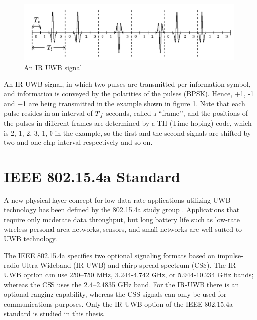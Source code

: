 \documentclass[\main/main.tex]{subfiles}
\begin{document}

\begin{figure}[H]
    \centering
    \includegraphics[width=1\textwidth]{an_ir_uwb_signal}
    \caption{An IR UWB signal}
    \label{fig:an_ir_uwb_signal}
\end{figure}

An IR UWB signal, in which two pulses are transmitted per information symbol, and information is conveyed by the polarities of the pulses (BPSK). Hence, +1, -1 and +1 are being transmitted in the example shown in figure \ref{fig:an_ir_uwb_signal}. Note that each pulse resides in an interval of $T\textsubscript{$f$}$ seconds, called a “frame’’, and the positions of the pulses in different frames are determined by a TH (Time-hoping) code, which is {2, 1, 2, 3, 1, 0} in the example, so the first and the second signals are shifted by two and one chip-interval respectively and so on. 

\section{IEEE 802.15.4a Standard}
A new physical layer concept for low data rate applications utilizing UWB technology has been defined by the 802.15.4a study group \cite{IEEE_Std_802_15_4_2015}. Applications that require only moderate data throughput, but long battery life such as low-rate wireless personal area networks, sensors, and small networks are well-suited to UWB technology.

The IEEE 802.15.4a specifies two optional signaling formats based on  impulse-radio Ultra-Wideband (IR-UWB) and chirp spread spectrum (CSS). The IR-UWB option can use 250–750 MHz, 3.244-4.742 GHz, or 5.944-10.234 GHz bands; whereas the CSS uses the 2.4–2.4835 GHz band. For the IR-UWB there is an optional ranging capability, whereas the CSS signals can only be used for communications purposes. Only the IR-UWB option of the IEEE 802.15.4a standard is studied in this thesis.
\end{document}
